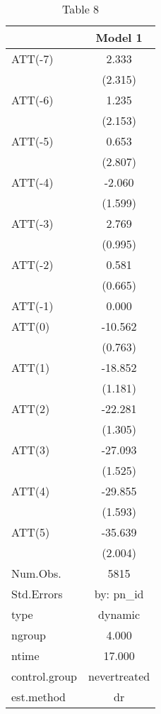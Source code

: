 \begin{table}

\caption{Table 8}
\centering
\begin{tabular}[t]{lc}
\toprule
  & Model 1\\
\midrule
ATT(-7) & 2.333\\
 & (2.315)\\
ATT(-6) & 1.235\\
 & (2.153)\\
ATT(-5) & 0.653\\
 & (2.807)\\
ATT(-4) & -2.060\\
 & (1.599)\\
ATT(-3) & 2.769\\
 & (0.995)\\
ATT(-2) & 0.581\\
 & (0.665)\\
ATT(-1) & 0.000\\
ATT(0) & -10.562\\
 & (0.763)\\
ATT(1) & -18.852\\
 & (1.181)\\
ATT(2) & -22.281\\
 & (1.305)\\
ATT(3) & -27.093\\
 & (1.525)\\
ATT(4) & -29.855\\
 & (1.593)\\
ATT(5) & -35.639\\
 & (2.004)\\
\midrule
Num.Obs. & 5815\\
Std.Errors & by: pn\_id\\
type & dynamic\\
ngroup & 4.000\\
ntime & 17.000\\
control.group & nevertreated\\
est.method & dr\\
\bottomrule
\end{tabular}
\end{table}
